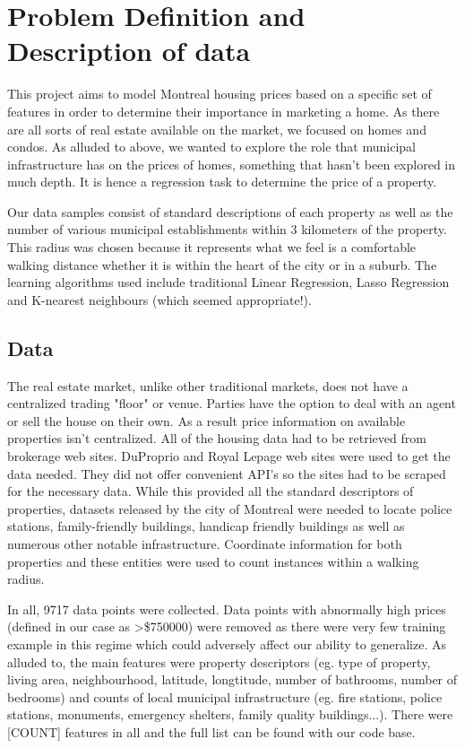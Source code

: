 \documentclass{acm_proc_article-sp}
\begin{document}
\section{Problem Definition and Description of data}
	
	This project aims to model Montreal housing prices based on a specific set of features in order to determine their importance in marketing a home. As there are all sorts of real estate available on the market, we focused on homes and condos. As alluded to above, we wanted to explore the role that municipal infrastructure has on the prices of homes, something that hasn't been explored in much depth. It is hence a regression task to determine the price of a property.
	
	Our data samples consist of standard descriptions of each property as well as the number of various municipal establishments within 3 kilometers of the property. This radius was chosen because it represents what we feel is a comfortable walking distance whether it is within the heart of the city or in a suburb. The learning algorithms used include traditional Linear Regression, Lasso Regression and K-nearest neighbours (which seemed appropriate!). 

\subsection{Data}

	The real estate market, unlike other traditional markets, does not have a centralized trading "floor" or venue. Parties have the option to deal with an agent or sell the house on their own. As a result price information on available properties isn't centralized. All of the housing data had to be retrieved from brokerage web sites. DuProprio and Royal Lepage web sites were used to get the data needed. They did not offer convenient API's so the sites had to be scraped for the necessary data. While this provided all the standard descriptors of properties, datasets released by the city of Montreal were needed to locate police stations, family-friendly buildings, handicap friendly buildings as well as numerous other notable infrastructure. Coordinate information for both properties and these entities were used to count instances within a walking radius.
	
	In all, 9717 data points were collected. Data points with abnormally high prices (defined in our case as >\$750000) were removed as there were very few training example in this regime which could adversely affect our ability to generalize. As alluded to, the main features were property descriptors (eg. type of property, living area, neighbourhood, latitude, longtitude, number of bathrooms, number of bedrooms) and counts of local municipal infrastructure (eg. fire stations, police stations, monuments, emergency shelters, family quality buildings...). There were [COUNT] features in all and the full list can be found with our code base.
	
\end{document}
